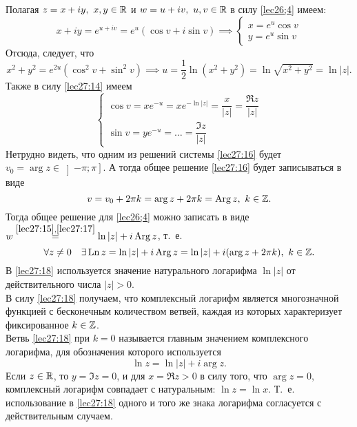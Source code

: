 \documentclass[../../main.tex]{subfiles}
\begin{document}
Полагая $ z = x + iy,\ x, y \in \mathbb{R} $ и $ w = u + iv,\ u, v \in \mathbb{R} $
в силу \eqref{lec26;4} имеем:
\begin{equation}
\label{lec27:14}
x + iy = e^{u + iv} = e^u(\cos v + i\sin v) \implies
\begin{cases}
	x = e^u\cos v\\
	y = e^u\sin v
\end{cases}
\end{equation}
Отсюда, следует, что 
\begin{equation}
\label{lec27:15}
x^2 + y^2 = e^{2u}
(\cos^2 v + \sin^2 v) \implies 
u = \dfrac{1}{2} \ln(x^2 + y^2) = 
\ln \sqrt{x^2 + y^2} = \ln|z|.
\end{equation}
Также в силу \eqref{lec27:14} имеем
\begin{equation}
\label{lec27:16}
\begin{cases}
\cos v = xe^{-u} = xe^{-\ln|z|} = \dfrac{x}{|z|} = \dfrac{\Re z}{|z|}\\
\sin v = ye^{-u} = \dots = \dfrac{\Im z}{|z|}
\end{cases}
\end{equation}
Нетрудно видеть, что одним из решений системы \eqref{lec27:16} будет
$ v_0 = \arg z \in \left]-\pi; \pi\right] $. А тогда общее решение
\eqref{lec27:16} будет записываться в виде
\begin{equation}
\label{lec27:17}
v = v_0 + 2\pi k = \arg z + 2\pi k = \operatorname{Arg} z,\ k \in \mathbb{Z}.
\end{equation}
Тогда общее решение для \eqref{lec26;4} можно записать в виде $w 
\stackrel{\eqref{lec27:15}, \eqref{lec27:17}}{=}
\ln |z| + i \operatorname{Arg} z$, т.~е.
\begin{equation}
\label{lec27:18}
\forall z \neq 0 \quad \exists \operatorname{Ln} z = \ln |z| + i \operatorname{Arg} z = 
\ln |z| + i(\arg z + 2\pi k),\ k \in \mathbb{Z}.
\end{equation}
В \eqref{lec27:18} используется значение натурального логарифма
$ \ln|z| $ от действительного числа $ |z| > 0 $.\\
В силу \eqref{lec27:18} получаем, что комплексный логарифм является 
многозначной функцией с бесконечным количеством ветвей, каждая из которых
характеризует фиксированное $ k\in\mathbb{Z} $.\\
Ветвь \eqref{lec27:18} при $ k = 0 $ называется главным значением комплексного
логарифма, для обозначения которого используется 
\begin{equation}
\label{lec27:19}
\ln z = \ln|z| + i\arg z.
\end{equation}
Если $ z \in \mathbb{R} $, то $ y = \Im z = 0 $, и для 
$ x = \Re z > 0 $ в силу того, что $ \arg z = 0 $, комплексный логарифм
совпадает с натуральным: $ \ln z = \ln x $. Т.~е. использование в 
\eqref{lec27:18} одного и того же знака логарифма согласуется с действительным
случаем.
\end{document}
